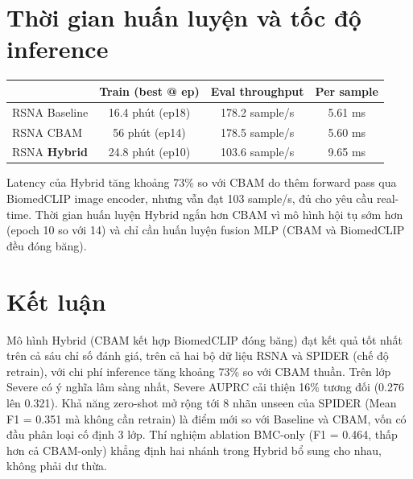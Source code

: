 \documentclass[11pt,a4paper]{article}
\newcommand{\best}[1]{\textcolor{best}{\textbf{#1}}}
\begin{document}
\section*{Thời gian huấn luyện và tốc độ inference}

\begin{tabular}{@{}lccc@{}}
\toprule
\rowcolor{tablehdr}
& Train (best @ ep) & Eval throughput & Per sample \\
\midrule
RSNA Baseline & 16.4 phút (ep18) & 178.2 sample/s & 5.61 ms \\
RSNA CBAM & 56 phút (ep14) & 178.5 sample/s & 5.60 ms \\
RSNA \best{Hybrid} & 24.8 phút (ep10) & 103.6 sample/s & 9.65 ms \\
\bottomrule
\end{tabular}

\vspace{0.3em}
\noindent Latency của Hybrid tăng khoảng 73\% so với CBAM do thêm forward pass qua BiomedCLIP image encoder, nhưng vẫn đạt 103 sample/s, đủ cho yêu cầu real-time. Thời gian huấn luyện Hybrid ngắn hơn CBAM vì mô hình hội tụ sớm hơn (epoch 10 so với 14) và chỉ cần huấn luyện fusion MLP (CBAM và BiomedCLIP đều đóng băng).

\section*{Kết luận}

\noindent Mô hình Hybrid (CBAM kết hợp BiomedCLIP đóng băng) đạt kết quả tốt nhất trên cả sáu chỉ số đánh giá, trên cả hai bộ dữ liệu RSNA và SPIDER (chế độ retrain), với chi phí inference tăng khoảng 73\% so với CBAM thuần. Trên lớp Severe có ý nghĩa lâm sàng nhất, Severe AUPRC cải thiện 16\% tương đối (0.276 lên 0.321). Khả năng zero-shot mở rộng tới 8 nhãn unseen của SPIDER (Mean F1 = 0.351 mà không cần retrain) là điểm mới so với Baseline và CBAM, vốn có đầu phân loại cố định 3 lớp. Thí nghiệm ablation BMC-only (F1 = 0.464, thấp hơn cả CBAM-only) khẳng định hai nhánh trong Hybrid bổ sung cho nhau, không phải dư thừa.
\end{document}

